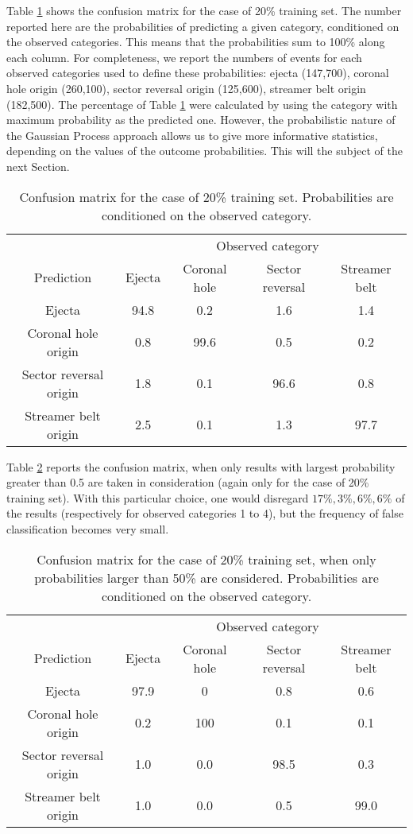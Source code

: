 \documentclass[draft,jgrga]{agutex}
\begin{document}
\begin{article}
{Table \ref{table:confusion_1} shows the confusion matrix for the case of 20\% training set. The number reported here are the probabilities of predicting a given category, conditioned on the observed categories. This means that the probabilities sum to 100\% along each column. For completeness, we report the numbers of events for each observed categories used to define these probabilities: ejecta (147,700), coronal hole origin (260,100), sector reversal origin (125,600), streamer belt origin (182,500). The percentage of Table \ref{table:confusion_1} were calculated by using the category with maximum probability as the predicted one. However, the probabilistic nature of the Gaussian Process approach allows us to give more informative statistics, depending on the values of the outcome probabilities. This will the subject of the next Section. 

\begin{table}[!ht]
\caption{Confusion matrix for the case of 20\% training set. Probabilities are conditioned on the observed category.}\label{table:confusion_1}
\centering
\begin{tabular}{c c c c c}
\hline
\multicolumn{4}{r}{Observed category}\\
 Prediction  & Ejecta & Coronal hole & Sector reversal & Streamer belt\\
\hline
  Ejecta  &  94.8 & 0.2 & 1.6 & 1.4\\
  Coronal hole origin  & 0.8 & 99.6 & 0.5 & 0.2\\
  Sector reversal origin   &1.8 & 0.1 & 96.6 & 0.8 \\
  Streamer belt origin  & 2.5 & 0.1 & 1.3 & 97.7\\
\hline
\end{tabular}
\end{table}

Table \ref{table:confusion_2} reports the confusion matrix, when only results with largest probability greater than 0.5 are taken in consideration (again only for the case of 20\% training set). With this particular choice, one would disregard $17\%, 3\%, 6\%, 6\%$ of the results (respectively for observed categories 1 to 4), but the frequency of false classification becomes very small.} 

\begin{table}[!ht]
\caption{Confusion matrix for the case of 20\% training set, when only probabilities larger than 50\% are considered. Probabilities are conditioned on the observed category.}\label{table:confusion_2}
\centering
\begin{tabular}{c c c c c}
\hline
\multicolumn{4}{r}{Observed category}\\
 Prediction  & Ejecta & Coronal hole & Sector reversal & Streamer belt\\
\hline
  Ejecta  &  97.9 & 0 & 0.8 &0.6\\
  Coronal hole origin  & 0.2 & 100 & 0.1 & 0.1\\
  Sector reversal origin   &1.0 & 0.0 & 98.5 & 0.3\\
  Streamer belt origin  & 1.0 & 0.0 & 0.5 & 99.0\\
\hline
\end{tabular}
\end{table}


\end{article}
\end{document}
